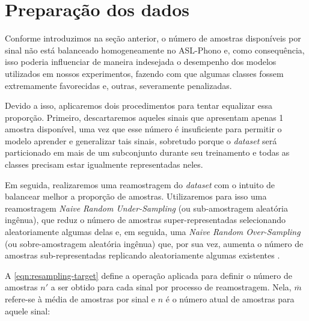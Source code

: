 \section{Preparação dos dados}
\label{sec:metodos-preparacao-dataset}


Conforme introduzimos na seção anterior, o número de amostras disponíveis por sinal não está balanceado homogeneamente no ASL-Phono e, como consequência, isso poderia influenciar de maneira indesejada o desempenho dos modelos utilizados em nossos experimentos, fazendo com que algumas classes fossem extremamente favorecidas e, outras, severamente penalizadas.


Devido a isso, aplicaremos dois procedimentos para tentar equalizar essa proporção. Primeiro, descartaremos aqueles sinais que apresentam apenas 1 amostra disponível, uma vez que esse número é insuficiente para permitir o modelo aprender e generalizar tais sinais, sobretudo porque o \textit{dataset} será particionado em mais de um subconjunto durante seu treinamento e todas as classes precisam estar igualmente representadas neles.

Em seguida, realizaremos uma reamostragem do \textit{dataset} com o intuito de balancear melhor a proporção de amostras.
Utilizaremos para isso uma reamostragem \textit{Naive Random Under-Sampling} (ou sub-amostragem aleatória ingênua), que reduz o número de amostras super-representadas selecionando aleatoriamente algumas delas e, em seguida, uma \textit{Naive Random Over-Sampling} (ou sobre-amostragem aleatória ingênua) que, por sua vez, aumenta o número de amostras sub-representadas replicando aleatoriamente algumas existentes \cite{he-2013-imbalanced}.

A \autoref{eqn:resampling-target} define a operação aplicada para definir o número de amostras \(n'\) a ser obtido para cada sinal por processo de reamostragem. Nela, \(\overline{m}\) refere-se à média de amostras por sinal e \(n\) é o número atual de amostras para aquele sinal:

